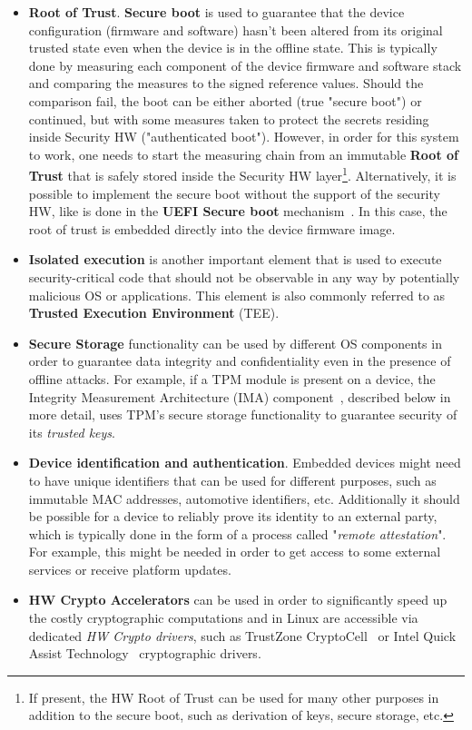 \begin{itemize}
	\item \textbf{Root of Trust}. \textbf{Secure boot} is used to guarantee that the device configuration (firmware and software) hasn't been altered from its original trusted state even when the device is in the offline state. This is typically done by measuring each component of the device firmware and software stack and comparing the measures to the signed reference values. Should the comparison fail, the boot can be either aborted (true "secure boot") or continued, but with some measures taken to protect the secrets residing inside Security HW ("authenticated boot"). However, in order for this system to work, one needs to start the measuring chain from an immutable \textbf{Root of Trust} that is safely stored inside the Security HW layer\footnote{If present, the HW Root of Trust can be used for many other purposes in addition to the secure boot, such as derivation of keys, secure storage, etc.}. Alternatively, it is possible to implement the secure boot without the support of the security HW, like is done in the \textbf{UEFI Secure boot} mechanism~\cite{uefi}. In this case, the root of trust is embedded directly into the device firmware image.
	\item \textbf{Isolated execution} is another important element that is used to execute security-critical code that should not be observable in any way by potentially malicious OS or applications. This element is also commonly referred to as \textbf{Trusted Execution Environment} (TEE).
	\item \textbf{Secure Storage} functionality can be used by different OS components in order to guarantee data integrity and confidentiality even in the presence of offline attacks. For example, if a TPM module is present on a device, the Integrity Measurement Architecture (IMA) component~\cite{ima}, described below in more detail, uses TPM's secure storage functionality to guarantee security of its \textit{trusted keys}.
	\item \textbf{Device identification and authentication}. Embedded devices might need to have unique identifiers that can be used for different purposes, such as immutable MAC addresses, automotive identifiers, etc.  Additionally it should be possible for a device to reliably prove its identity to an external party, which is typically done in the form of a process called "\textit{remote attestation}". For example, this might be needed in order to get access to some external services or receive platform updates.
	\item \textbf{HW Crypto Accelerators} can be used in order to significantly speed up the costly cryptographic computations and in Linux are accessible via dedicated \textit{HW Crypto drivers}, such as TrustZone CryptoCell~\cite{cryptocell} or Intel Quick Assist Technology~\cite{intelQAT} cryptographic drivers.
\end{itemize}

